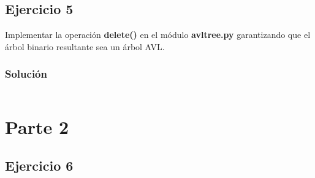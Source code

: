 \documentclass{article}
\begin{document}
\subsection*{Ejercicio 5}
Implementar la operación \textbf{delete()} en  el módulo \textbf{avltree.py} garantizando que el árbol  binario resultante sea un árbol AVL.
\subsubsection*{Solución}
\inputminted{python3}{./code/snippets/ejercicio5.py}


\section*{Parte 2}
\subsection*{Ejercicio 6}
\end{document}
